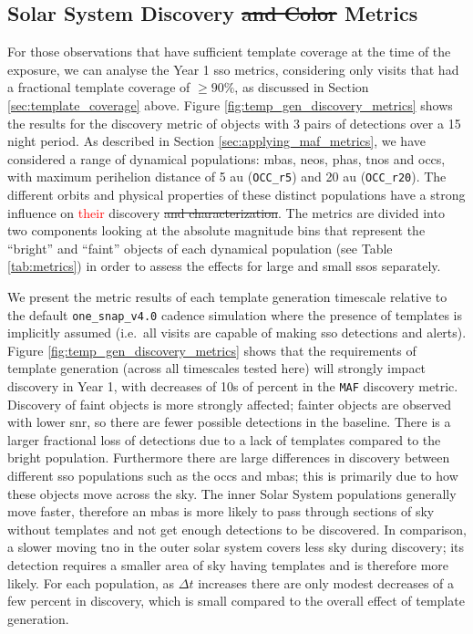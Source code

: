 \documentclass[preprintm,linenumbers]{aastex631}
\newcommand{\baseline}{\texttt{one\_snap\_v4.0}\xspace}
\newcommand{\maf}{\texttt{MAF}\xspace}
\newcommand{\occrfive}{\texttt{OCC\_r5}\xspace}
\newcommand{\occrtwenty}{\texttt{OCC\_r20}\xspace}
\providecommand{\red}[1]{\textcolor{red}{#1}}
\begin{document}
		\subsection{Solar System Discovery \sout{and Color} Metrics}
		\label{sec:sso_metrics}
		    For those observations that have sufficient template coverage at the time of the exposure, we can analyse the Year 1 \gls*{sso} metrics, considering only visits that had a fractional template coverage of $\geq 90 \%$, as discussed in Section \ref{sec:template_coverage} above.	
		Figure \ref{fig:temp_gen_discovery_metrics} shows the results for the discovery metric of objects with 3 pairs of detections over a 15 night period.
		As described in Section \ref{sec:applying_maf_metrics}, we have considered a range of dynamical populations: \glspl*{mba}, \glspl*{neo}, \glspl*{pha}, \glspl*{tno} and \glspl*{occ}, with maximum perihelion distance of 5 au (\occrfive) and 20 au (\occrtwenty).
  The different orbits and physical properties of these distinct populations have a strong influence on \red{their} discovery \sout{and characterization}.
  The metrics are divided into two components looking at the absolute magnitude bins that represent the ``bright'' and ``faint'' objects of each dynamical population (see Table \ref{tab:metrics}) in order to assess the effects for large and small \glspl*{sso} separately.
		
        We present the metric results of each template generation timescale relative to the default \baseline cadence simulation where the presence of templates is implicitly assumed (i.e.\ all visits are capable of making \gls*{sso} detections and alerts).
  Figure \ref{fig:temp_gen_discovery_metrics} shows that the requirements of template generation (across all timescales tested here) will strongly impact discovery in Year 1, with decreases of 10s of percent in the \maf discovery metric.
Discovery of faint objects is more strongly affected; fainter objects are observed with lower \gls*{snr}, so there are fewer possible detections in the baseline.
There is a larger fractional loss of detections due to a lack of templates compared to the bright population.
  Furthermore there are large differences in discovery between different \gls*{sso} populations such as the \glspl*{occ} and \glspl*{mba}; this is primarily due to how these objects move across the sky.
  The inner Solar System populations generally move faster, therefore an \glspl*{mba} is more likely to pass through sections of sky without templates and not get enough detections to be discovered.
  In comparison, a slower moving \gls*{tno} in the outer solar system covers less sky during discovery; its detection requires a smaller area of sky having templates and is therefore more likely.
  For each population, as $\Delta t$ increases there are only modest decreases of a few percent in discovery, which is small compared to the overall effect of template generation.
  
\end{document}
